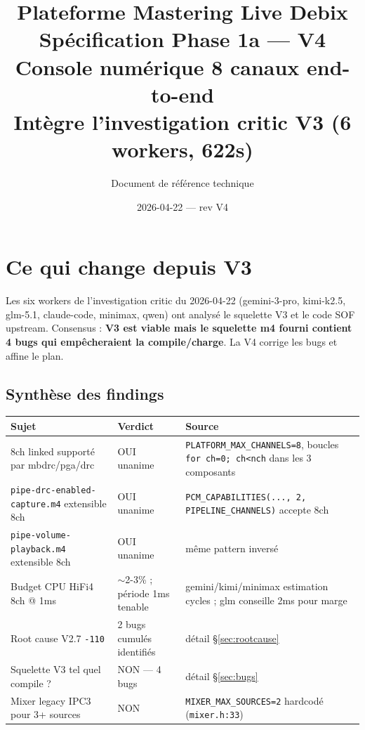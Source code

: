 \documentclass[11pt,a4paper]{article}
\title{\textbf{Plateforme Mastering Live Debix}\\[6pt]
  \Large Spécification Phase 1a --- \textbf{V4}\\[4pt]
  \large Console numérique 8 canaux end-to-end\\
  \normalsize Intègre l'investigation critic V3 (6 workers, 622s)}
\author{Document de référence technique}
\date{2026-04-22 --- rev V4}
\begin{document}
\maketitle
\tableofcontents
\clearpage

\section{Ce qui change depuis V3}

Les six workers de l'investigation critic du 2026-04-22 (gemini-3-pro, kimi-k2.5, glm-5.1, claude-code, minimax, qwen) ont analysé le squelette V3 et le code SOF upstream. Consensus : \textbf{V3 est viable mais le squelette m4 fourni contient 4 bugs qui empêcheraient la compile/charge}. La V4 corrige les bugs et affine le plan.

\subsection{Synthèse des findings}

\begin{center}
\begin{tabularx}{\textwidth}{llX}
\toprule
\textbf{Sujet} & \textbf{Verdict} & \textbf{Source} \\
\midrule
8ch linked supporté par mbdrc/pga/drc & \textcolor{cok}{OUI} unanime & \texttt{PLATFORM\_MAX\_CHANNELS=8}, boucles \texttt{for ch=0; ch<nch} dans les 3 composants \\
\texttt{pipe-drc-enabled-capture.m4} extensible 8ch & \textcolor{cok}{OUI} unanime & \texttt{PCM\_CAPABILITIES(..., 2, PIPELINE\_CHANNELS)} accepte 8ch \\
\texttt{pipe-volume-playback.m4} extensible 8ch & \textcolor{cok}{OUI} unanime & même pattern inversé \\
Budget CPU HiFi4 8ch @ 1ms & \textcolor{cok}{$\sim$2-3\%} ; période 1ms tenable & gemini/kimi/minimax estimation cycles ; glm conseille 2ms pour marge \\
Root cause V2.7 \texttt{-110} & \textcolor{cbug}{2 bugs cumulés} identifiés & détail \S\ref{sec:rootcause} \\
Squelette V3 tel quel compile ? & \textcolor{cbug}{NON} --- 4 bugs & détail \S\ref{sec:bugs} \\
Mixer legacy IPC3 pour 3+ sources & \textcolor{cbug}{NON} & \texttt{MIXER\_MAX\_SOURCES=2} hardcodé (\texttt{mixer.h:33}) \\
\bottomrule
\end{tabularx}
\end{center}
\end{document}
